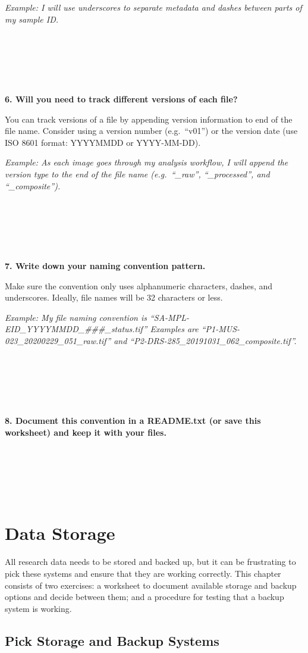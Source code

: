 \documentclass[
]{book}
\begin{document}
\emph{Example: I will use underscores to separate metadata and dashes between parts of my sample ID.}

~

~

~

\textbf{6. Will you need to track different versions of each file?}

You can track versions of a file by appending version information to end of the file name. Consider using a version number (e.g.~``v01'') or the version date (use ISO 8601 format: YYYYMMDD or YYYY-MM-DD).

\emph{Example: As each image goes through my analysis workflow, I will append the version type to the end of the file name (e.g.~``\_raw'', ``\_processed'', and ``\_composite'').}

~

~

~

\textbf{7. Write down your naming convention pattern.}

Make sure the convention only uses alphanumeric characters, dashes, and underscores. Ideally, file names will be 32 characters or less.

\emph{Example: My file naming convention is ``SA-MPL-EID\_YYYYMMDD\_\#\#\#\_status.tif'' Examples are ``P1-MUS-023\_20200229\_051\_raw.tif'' and ``P2-DRS-285\_20191031\_062\_composite.tif''.}

~

~

~

\textbf{8. Document this convention in a README.txt (or save this worksheet) and keep it with your files.}

~

~

~

\hypertarget{data-storage}{%
\chapter{Data Storage}\label{data-storage}}

All research data needs to be stored and backed up, but it can be frustrating to pick these systems and ensure that they are working correctly. This chapter consists of two exercises: a worksheet to document available storage and backup options and decide between them; and a procedure for testing that a backup system is working.

\newpage

\hypertarget{storage}{%
\section{Pick Storage and Backup Systems}\label{storage}}
\end{document}
